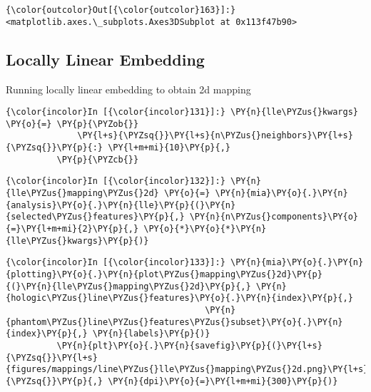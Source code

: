             \begin{Verbatim}[commandchars=\\\{\}]
{\color{outcolor}Out[{\color{outcolor}163}]:} <matplotlib.axes.\_subplots.Axes3DSubplot at 0x113f47b90>
\end{Verbatim}

    \subsection{Locally Linear Embedding}\label{locally-linear-embedding}

Running locally linear embedding to obtain 2d mapping

    \begin{Verbatim}[commandchars=\\\{\}]
{\color{incolor}In [{\color{incolor}131}]:} \PY{n}{lle\PYZus{}kwargs} \PY{o}{=} \PY{p}{\PYZob{}}
              \PY{l+s}{\PYZsq{}}\PY{l+s}{n\PYZus{}neighbors}\PY{l+s}{\PYZsq{}}\PY{p}{:} \PY{l+m+mi}{10}\PY{p}{,}
          \PY{p}{\PYZcb{}}
\end{Verbatim}

    \begin{Verbatim}[commandchars=\\\{\}]
{\color{incolor}In [{\color{incolor}132}]:} \PY{n}{lle\PYZus{}mapping\PYZus{}2d} \PY{o}{=} \PY{n}{mia}\PY{o}{.}\PY{n}{analysis}\PY{o}{.}\PY{n}{lle}\PY{p}{(}\PY{n}{selected\PYZus{}features}\PY{p}{,} \PY{n}{n\PYZus{}components}\PY{o}{=}\PY{l+m+mi}{2}\PY{p}{,} \PY{o}{*}\PY{o}{*}\PY{n}{lle\PYZus{}kwargs}\PY{p}{)}
\end{Verbatim}

    \begin{Verbatim}[commandchars=\\\{\}]
{\color{incolor}In [{\color{incolor}133}]:} \PY{n}{mia}\PY{o}{.}\PY{n}{plotting}\PY{o}{.}\PY{n}{plot\PYZus{}mapping\PYZus{}2d}\PY{p}{(}\PY{n}{lle\PYZus{}mapping\PYZus{}2d}\PY{p}{,} \PY{n}{hologic\PYZus{}line\PYZus{}features}\PY{o}{.}\PY{n}{index}\PY{p}{,}
                                       \PY{n}{phantom\PYZus{}line\PYZus{}features\PYZus{}subset}\PY{o}{.}\PY{n}{index}\PY{p}{,} \PY{n}{labels}\PY{p}{)}
          \PY{n}{plt}\PY{o}{.}\PY{n}{savefig}\PY{p}{(}\PY{l+s}{\PYZsq{}}\PY{l+s}{figures/mappings/line\PYZus{}lle\PYZus{}mapping\PYZus{}2d.png}\PY{l+s}{\PYZsq{}}\PY{p}{,} \PY{n}{dpi}\PY{o}{=}\PY{l+m+mi}{300}\PY{p}{)}
\end{Verbatim}

    \begin{center}
    \end{center}
    { \hspace*{\fill} \\}

